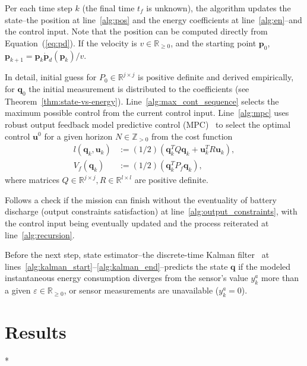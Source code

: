 \documentclass[letterpaper,10pt,conference]{ieeeconf}
\theoremstyle{definition}
\begin{document}
Per each time step $k$ (the final time $t_f$ is unknown), the algorithm updates the state--the position at line~\ref{alg:pos} and the energy coefficients at line~\ref{alg:en}--and the control input. Note that the position can be computed directly from Equation~(\ref{eq:pd}). If the velocity is $v\in\mathbb{R}_{\geq 0}$, and the starting point $\mathbf{p}_0$, $\mathbf{p}_{k+1}=\mathbf{p}_k\dot{\mathbf{p}}_d(\mathbf{p}_k)/v$.
  
In detail, initial guess for $P_0\in\mathbb{R}^{j\times j}$ is positive definite and derived empirically, for $\mathbf{q}_0$ the initial measurement is distributed to the coefficients (see Theorem~\ref{thm:state-vs-energy}). Line~\ref{alg:max_cont_sequence} selects the maximum possible control from the current control input. Line~\ref{alg:mpc} uses robust output feedback model predictive control (MPC)~\cite{rawlings2017model} to select the optimal control $\mathbf{u}^0$ for a given horizon $N\in\mathbb{Z}_{>0}$ from the cost function
\begin{equation}\begin{split}
  l(\mathbf{q}_k,\mathbf{u}_k)&:=(1/2)(\mathbf{q}_k^TQ\mathbf{q}_k+\mathbf{u}_k^TR\mathbf{u}_k),\\
  V_f(\mathbf{q}_k)&:=(1/2)(\mathbf{q}_k^TP_f\mathbf{q}_k),
\end{split}\end{equation}
where matrices $Q\in\mathbb{R}^{j\times j},R\in\mathbb{R}^{l\times l}$ are positive definite.

Follows a check if the mission can finish without the eventuality of battery discharge (output constraints satisfaction) at line~\ref{alg:output_constraints}, with the control input being eventually updated and the process reiterated at line~\ref{alg:recursion}.

Before the next step, state estimator--the discrete-time Kalman filter~\cite{simon2006optimal} at lines~\ref{alg:kalman_start}--\ref{alg:kalman_end}--predicts the state $\mathbf{q}$ if the modeled instantaneous energy consumption diverges from the sensor's value $y_k^a$ more than a given $\varepsilon\in\mathbb{R}_{\geq  0}$, or sensor measurements are unavailable ($y_k^a=0$).


\section{Results}
\label{sec:experimental}

*

\end{document}
